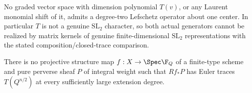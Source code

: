 \begin{finding}
\label{f:iteratedPositiveLefschetzGate}
No graded vector space with dimension polynomial
\(T(v)\), or any Laurent monomial shift of it,
admits a degree-two Lefschetz operator about one
center. In particular \(T\) is not a genuine
\(\mathrm{SL}_2\) character, so both actual
generators cannot be realized by matrix kernels
of genuine finite-dimensional
\(\mathrm{SL}_2\) representations with the
stated composition/closed-trace comparison.

There is no projective structure map
\(f:X\to\Spec\F_Q\) of a finite-type scheme
and pure perverse sheaf \(P\) of integral weight
such that \(Rf_*P\) has Euler traces
\(T(Q^{n/2})\) at every sufficiently large
extension degree.
\end{finding}

